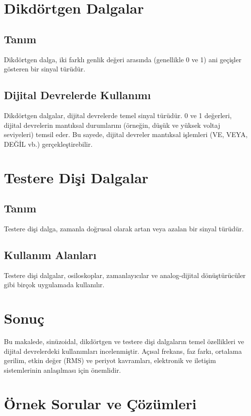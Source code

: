 \documentclass[11pt,letterpaper]{fenbil}
\begin{document}
\begin{spacing}{1.2}
\section*{Dikdörtgen Dalgalar}
\subsection*{Tanım}
Dikdörtgen dalga, iki farklı genlik değeri arasında (genellikle 0 ve 1) ani geçişler gösteren bir sinyal türüdür.

\subsection*{Dijital Devrelerde Kullanımı}
Dikdörtgen dalgalar, dijital devrelerde temel sinyal türüdür. 0 ve 1 değerleri, dijital devrelerin mantıksal durumlarını (örneğin, düşük ve yüksek voltaj seviyeleri) temsil eder. Bu sayede, dijital devreler mantıksal işlemleri (VE, VEYA, DEĞİL vb.) gerçekleştirebilir.

\section*{Testere Dişi Dalgalar}
\subsection*{Tanım}
Testere dişi dalga, zamanla doğrusal olarak artan veya azalan bir sinyal türüdür.

\subsection*{Kullanım Alanları}
Testere dişi dalgalar, osiloskoplar, zamanlayıcılar ve analog-dijital dönüştürücüler gibi birçok uygulamada kullanılır.

\section*{Sonuç}
Bu makalede, sinüzoidal, dikdörtgen ve testere dişi dalgaların temel özellikleri ve dijital devrelerdeki kullanımları incelenmiştir. Açısal frekans, faz farkı, ortalama gerilim, etkin değer (RMS) ve periyot kavramları, elektronik ve iletişim sistemlerinin anlaşılması için önemlidir.

\section*{Örnek Sorular ve Çözümleri}


\end{spacing}
\end{document}
